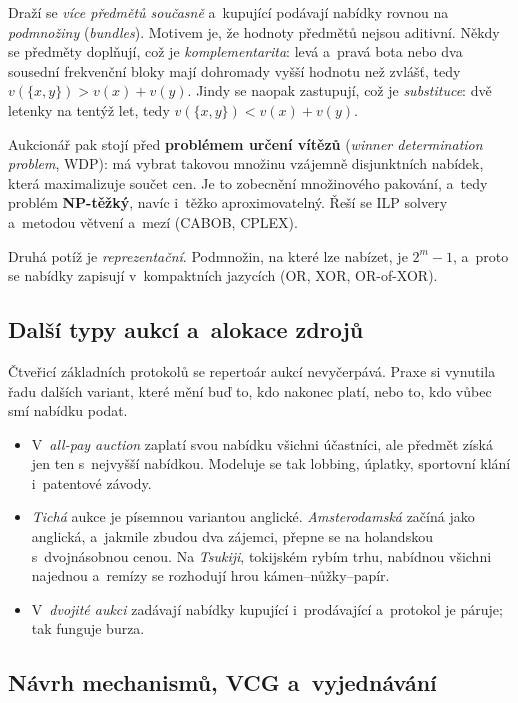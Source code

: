 \documentclass[11pt,a4paper]{article}
\theoremstyle{definition}
\begin{document}
\begin{defbox}
Draží se \emph{více předmětů současně} a~kupující podávají nabídky rovnou na \emph{podmnožiny}
(\emph{bundles}). Motivem je, že hodnoty předmětů nejsou aditivní. Někdy se předměty doplňují,
což je \emph{komplementarita}: levá a~pravá bota nebo dva sousední frekvenční bloky mají
dohromady vyšší hodnotu než zvlášť, tedy $v(\{x,y\}) > v(x)+v(y)$. Jindy se naopak zastupují,
což je \emph{substituce}: dvě letenky na tentýž let, tedy $v(\{x,y\}) < v(x)+v(y)$.

Aukcionář pak stojí před \textbf{problémem určení vítězů} (\emph{winner determination problem},
WDP): má vybrat takovou množinu vzájemně disjunktních nabídek, která maximalizuje součet cen.
Je to zobecnění množinového pakování, a~tedy problém \textbf{NP-těžký}, navíc i~těžko
aproximovatelný. Řeší se ILP solvery a~metodou větvení a~mezí (CABOB, CPLEX).

Druhá potíž je \emph{reprezentační}. Podmnožin, na které lze nabízet, je $2^m - 1$, a~proto se
nabídky zapisují v~kompaktních jazycích (OR, XOR, OR-of-XOR).
\end{defbox}
\subsection{Další typy aukcí a~alokace zdrojů}

Čtveřicí základních protokolů se repertoár aukcí nevyčerpává. Praxe si vynutila řadu dalších
variant, které mění buď to, kdo nakonec platí, nebo to, kdo vůbec smí nabídku podat.

\begin{itemize}
\item V~\emph{all-pay auction} zaplatí svou nabídku všichni účastníci, ale předmět získá jen ten
  s~nejvyšší nabídkou. Modeluje se tak lobbing, úplatky, sportovní klání i~patentové závody.
\item \emph{Tichá} aukce je písemnou variantou anglické. \emph{Amsterodamská} začíná jako
  anglická, a~jakmile zbudou dva zájemci, přepne se na holandskou s~dvojnásobnou cenou.
  Na \emph{Tsukiji}, tokijském rybím trhu, nabídnou všichni najednou a~remízy se rozhodují
  hrou kámen--nůžky--papír.
\item V~\emph{dvojité aukci} zadávají nabídky kupující i~prodávající a~protokol je páruje;
  tak funguje burza.
\end{itemize}

\subsection{Návrh mechanismů, VCG a~vyjednávání}
\end{document}
